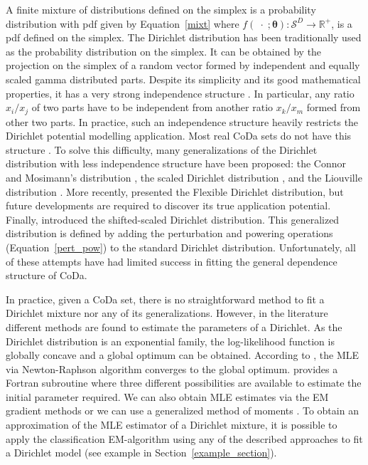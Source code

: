 \documentclass[12pt, a4paper]{article}
\newcommand{\m}[1]{\boldsymbol{#1}}
\begin{document}
\noindent A finite mixture of distributions defined on the simplex is a probability distribution with pdf given by Equation~\ref{mixt} where $f(\;\cdot\;;\m\theta): \mathcal{S}^D \rightarrow \mathbb{R}^+$, is a pdf defined on the simplex. The Dirichlet distribution has been traditionally used as the probability distribution on the simplex. It can be obtained by the projection on the simplex of a random vector formed by independent and equally scaled gamma distributed parts.  Despite its simplicity and its good mathematical properties, it has a very strong independence structure \citep{aitchison1986statistical}. In particular, any ratio $x_i/x_j$ of two parts have to be independent from another ratio $x_k/x_m$ formed from other two parts. In practice, such an independence structure heavily restricts the Dirichlet potential modelling application. Most real CoDa sets do not have this structure \citep{aitchison1986statistical}. To solve this difficulty, many generalizations of the Dirichlet distribution with less independence structure have been proposed: the Connor and Mosimann's distribution \citep{connor1969concepts}, the scaled Dirichlet distribution \citep{aitchison1986statistical},  and the Liouville distribution \citep{rayens1994dependence}.  More recently, \cite{ongaro2008new} presented the Flexible Dirichlet distribution, but future developments are required to discover its true application potential. Finally, \cite{monti2011shifted} introduced the shifted-scaled Dirichlet distribution. This generalized distribution is defined by adding the perturbation and powering operations (Equation~\ref{pert_pow}) to the standard Dirichlet distribution. Unfortunately, all of these attempts have had limited success in fitting the general dependence structure of CoDa.


In practice, given a CoDa set, there is no straightforward method to fit a Dirichlet mixture nor any of its generalizations. However, in the literature different methods are found to estimate the parameters of a Dirichlet. As the Dirichlet distribution is an exponential family, the log-likelihood function is globally concave and a global optimum can be obtained. According to \cite{ng2011dirichlet}, the MLE via Newton-Raphson algorithm converges to the global optimum. \cite{narayanan1991algorithm} provides a Fortran subroutine where three different possibilities are available to estimate the initial parameter required. We can also obtain MLE estimates via the EM gradient methods \citep{ng2011dirichlet} or we can use a generalized method of moments \citep{hansen1982large}. To obtain an approximation of the MLE estimator of a Dirichlet mixture, it is possible to apply the classification EM-algorithm \citep{celeux1992classification} using any of the described approaches to fit a Dirichlet model (see example in Section~\ref{example_section}).
\end{document}
